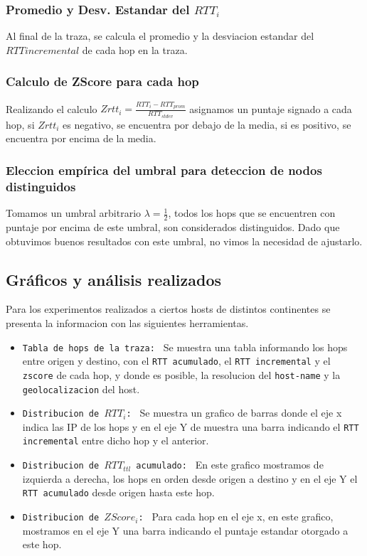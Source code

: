 \subsubsection{Promedio y Desv. Estandar del $RTT_i$}
Al final de la traza, se calcula el promedio y la desviacion estandar del $RTT incremental$ de cada hop en la traza.
\subsubsection{Calculo de ZScore para cada hop}
Realizando el calculo $Zrtt_i = \frac{RTT_i - RTT_{prom}}{RTT_{stdev}}$ asignamos un puntaje signado a cada hop, si $Zrtt_i$ es negativo, se encuentra por debajo de la media, si es positivo, se encuentra por encima de la media.

\subsubsection{Eleccion emp\'irica del umbral para deteccion de nodos distinguidos}
Tomamos un umbral arbitrario $\lambda=\frac{1}{2}$, todos los hops que se encuentren con puntaje por encima de este umbral, son considerados distinguidos. Dado que obtuvimos buenos resultados con este umbral, no vimos la necesidad de ajustarlo.

\subsection{Gr\'aficos y an\'alisis realizados}
Para los experimentos realizados a ciertos hosts de distintos continentes se presenta la informacion con las siguientes herramientas.
\begin{itemize}
	\item \texttt{Tabla de hops de la traza: }
	Se muestra una tabla informando los hops entre origen y destino, con el \texttt{RTT acumulado}, el \texttt{RTT incremental} y el \texttt{zscore} de cada hop, y donde es posible, la resolucion del \texttt{host-name} y la \texttt{geolocalizacion} del host.

	\item \texttt{Distribucion de $RTT_i$: }
		Se muestra un grafico de barras donde el eje x indica las IP de los hops y en el eje Y de muestra una barra indicando el \texttt{RTT incremental} entre dicho hop y el anterior.
	\item \texttt{Distribucion de $RTT_{ttl}$ acumulado: }
		En este grafico mostramos de izquierda a derecha, los hops en orden desde origen a destino y en el eje Y el \texttt{RTT acumulado} desde origen hasta este hop.
	\item \texttt{Distribucion de $ZScore_i$: }
		Para cada hop en el eje x, en este grafico, mostramos en el eje Y una barra indicando el puntaje estandar otorgado a este hop.
\end{itemize}

